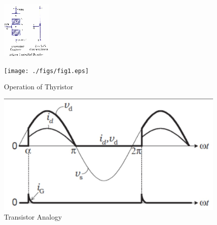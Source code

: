 \documentclass[journal,12pt,twocolumn]{IEEEtran}
\begin{document}
\begin{figure}[!h]
\centering
\includegraphics[width=\columnwidth]{./figs/scrdiagram.eps}

\label{fig0}
\end{figure}


\begin{figure}[!h]
\centering
\texttt{[image: ./figs/fig1.eps]}

\caption{Operation of Thyristor  } 
\label{fig1}
\end{figure}


\begin{figure}[!h]
\centering
\includegraphics[width=\columnwidth]{./figs/fig2.eps}

\caption{Transistor Analogy} 
\label{fig2}
\end{figure}
\end{document}
